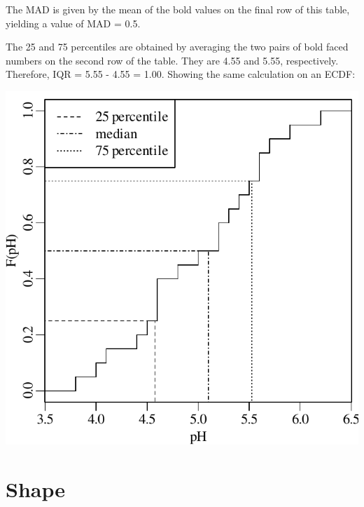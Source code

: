 The MAD is given by the mean of the bold values on the final row of
this table, yielding a value of MAD = 0.5.\medskip

The 25 and 75 percentiles are obtained by averaging the two pairs of
bold faced numbers on the second row of the table. They are 4.55 and
5.55, respectively. Therefore, IQR = 5.55 - 4.55 = 1.00. Showing the
same calculation on an ECDF:

\noindent\begin{minipage}[t][][b]{.4\textwidth}
\includegraphics[]{../figures/IQRpH.pdf}
\end{minipage}
\begin{minipage}[t][][t]{.6\textwidth}
\end{minipage}

\section{Shape}
\label{sec:shape}

